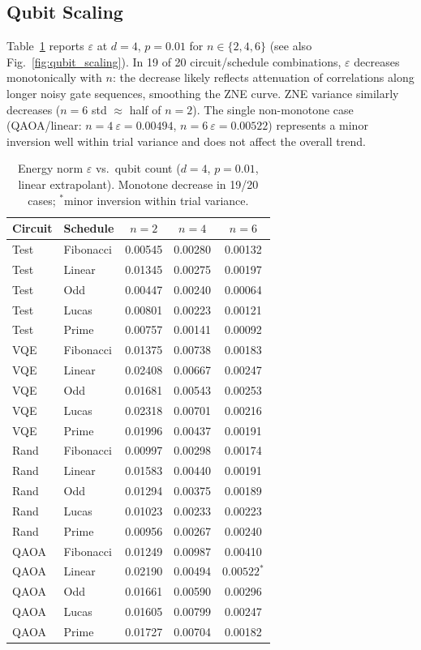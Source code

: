 \documentclass[10pt,letterpaper]{article}
\begin{document}
\subsection{Qubit Scaling}

Table~\ref{tab:qubit} reports $\varepsilon$ at $d=4$, $p=0.01$ for
$n\in\{2,4,6\}$ (see also Fig.~\ref{fig:qubit_scaling}). In 19 of 20 circuit/schedule combinations,
$\varepsilon$ decreases monotonically with $n$: the decrease likely
reflects attenuation of correlations along longer noisy gate sequences,
smoothing the ZNE curve.
ZNE variance similarly decreases
($n=6$ std $\approx$ half of $n=2$).
The single non-monotone case (QAOA/linear: $n{=}4\ \varepsilon=0.00494$,
$n{=}6\ \varepsilon=0.00522$) represents a minor inversion well within
trial variance and does not affect the overall trend.

\begin{table}[H]
\caption{Energy norm $\varepsilon$ vs.\ qubit count ($d=4$, $p=0.01$,
  linear extrapolant). Monotone decrease in 19/20 cases;
  $^*$minor inversion within trial variance.}
\label{tab:qubit}
\centering\small
\setlength{\tabcolsep}{5pt}
\begin{tabular}{llccc}
\toprule
Circuit & Schedule  & $n{=}2$ & $n{=}4$ & $n{=}6$ \\
\midrule
Test & Fibonacci & 0.00545 & 0.00280 & 0.00132 \\
Test & Linear    & 0.01345 & 0.00275 & 0.00197 \\
Test & Odd       & 0.00447 & 0.00240 & 0.00064 \\
Test & Lucas     & 0.00801 & 0.00223 & 0.00121 \\
Test & Prime     & 0.00757 & 0.00141 & 0.00092 \\
\midrule
VQE  & Fibonacci & 0.01375 & 0.00738 & 0.00183 \\
VQE  & Linear    & 0.02408 & 0.00667 & 0.00247 \\
VQE  & Odd       & 0.01681 & 0.00543 & 0.00253 \\
VQE  & Lucas     & 0.02318 & 0.00701 & 0.00216 \\
VQE  & Prime     & 0.01996 & 0.00437 & 0.00191 \\
\midrule
Rand & Fibonacci & 0.00997 & 0.00298 & 0.00174 \\
Rand & Linear    & 0.01583 & 0.00440 & 0.00191 \\
Rand & Odd       & 0.01294 & 0.00375 & 0.00189 \\
Rand & Lucas     & 0.01023 & 0.00233 & 0.00223 \\
Rand & Prime     & 0.00956 & 0.00267 & 0.00240 \\
\midrule
QAOA & Fibonacci & 0.01249 & 0.00987 & 0.00410 \\
QAOA & Linear    & 0.02190 & 0.00494 & $0.00522^{*}$ \\
QAOA & Odd       & 0.01661 & 0.00590 & 0.00296 \\
QAOA & Lucas     & 0.01605 & 0.00799 & 0.00247 \\
QAOA & Prime     & 0.01727 & 0.00704 & 0.00182 \\
\bottomrule
\end{tabular}
\end{table}
\end{document}
